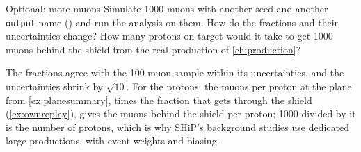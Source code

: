 \begin{exercise}[colback=white]{Optional: more muons}
Simulate 1000 muons with another seed and another \texttt{output} name
() and run the analysis on
them. How do the fractions and their uncertainties change? How many protons
on target would it take to get 1000 muons behind the shield from the real
production of \cref{ch:production}?
\end{exercise}

\begin{solution}
The fractions agree with the 100-muon sample within its uncertainties, and
the uncertainties shrink by $\sqrt{10}$. For the protons: the muons per proton
at the plane from \cref{ex:planesummary}, times the fraction that gets
through the shield (\cref{ex:ownreplay}), gives the muons behind the shield
per proton; 1000 divided by it is the number of protons, which is why SHiP's
background studies use dedicated large productions, with event weights and
biasing.
\end{solution}
